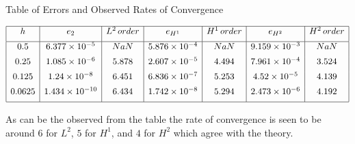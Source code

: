 \begin{table}[h]
  \begin{center}
    \caption{Table of Errors and Observed Rates of Convergence}
{\small
\begin{equation*}
  \begin{array}{|c|c|c|c|c|c|c|}
    \hline
    h & e_2 & L^2\, order & e_{H^1} & H^1\, order &e_{H^2} & H^2\, order \\[0.5em]
    \hline
    0.5 & 6.377\times 10^{-5} & NaN & 5.876\times 10^{-4} & NaN & 9.159\times 10^{-3} & NaN \\[0.5em]
    0.25 & 1.085\times 10^{-6} & 5.878 & 2.607\times 10^{-5} & 4.494 & 7.961\times 10^{-4} & 3.524 \\[0.5em]
    0.125 & 1.24\times 10^{-8} & 6.451 & 6.836\times 10^{-7} & 5.253 & 4.52\times 10^{-5} & 4.139 \\[0.5em]
    0.0625 & 1.434\times 10^{-10} & 6.434 & 1.742\times 10^{-8} & 5.294 & 2.473\times 10^{-6} & 4.192 \\[0.5em]
    \hline
  \end{array}
\end{equation*}}
\end{center}
\label{tab:Errors}
\end{table}
As can be the observed from the table the rate of convergence is seen to be
around $6$ for $L^2$, $5$ for $H^1$, and $4$ for $H^2$ which agree with the
theory.
